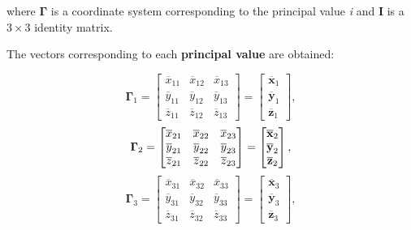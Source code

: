 \begin{itemize}
        where $\mathbf{\Gamma}$ is a coordinate system corresponding to the
        principal value \textit{i} and $\mathbf{I}$ is a $3 \times 3$
        identity matrix.

        The vectors corresponding to each \textbf{principal value} are obtained:

        \begin{equation}
            \mathbf{\Gamma}_{1}
            = \begin{bmatrix}
                \overline{x}_{11} & \overline{x}_{12} & \overline{x}_{13}\\
                \overline{y}_{11} & \overline{y}_{12} & \overline{y}_{13}\\
                \overline{z}_{11} & \overline{z}_{12} & \overline{z}_{13}
            \end{bmatrix}
            = \begin{bmatrix}
                \overline{\mathbf{x}}_{1}\\
                \overline{\mathbf{y}}_{1}\\
                \overline{\mathbf{z}}_{1}
            \end{bmatrix}
        ,\end{equation}
        \begin{equation}
            \mathbf{\Gamma}_{2}
            = \begin{bmatrix}
                \overline{x}_{21} & \overline{x}_{22} & \overline{x}_{23}\\
                \overline{y}_{21} & \overline{y}_{22} & \overline{y}_{23}\\
                \overline{z}_{21} & \overline{z}_{22} & \overline{z}_{23}
            \end{bmatrix}
            = \begin{bmatrix}
                \overline{\mathbf{x}}_{2}\\
                \overline{\mathbf{y}}_{2}\\
                \overline{\mathbf{z}}_{2}
            \end{bmatrix} \\
        ,\end{equation}
        \begin{equation}
            \mathbf{\Gamma}_{3}
            = \begin{bmatrix}
                \overline{x}_{31} & \overline{x}_{32} & \overline{x}_{33}\\
                \overline{y}_{31} & \overline{y}_{32} & \overline{y}_{33}\\
                \overline{z}_{31} & \overline{z}_{32} & \overline{z}_{33}
            \end{bmatrix}
            = \begin{bmatrix}
                \overline{\mathbf{x}}_{3}\\
                \overline{\mathbf{y}}_{3}\\
                \overline{\mathbf{z}}_{3}
            \end{bmatrix}
        ,\end{equation}


\end{itemize}
